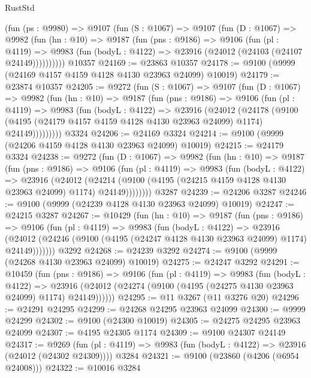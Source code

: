 \begin{lexlean}{RustStd}
\begin{coremodule}
    (fun (ps : @9980) =>
    @9107
      (fun (S : @1067) =>
      @9107
        (fun (D : @1067) =>
        @9982
          (fun (hn : @10) =>
          @9187
            (fun (pns : @9186) =>
            @9106
              (fun (pl : @4119) =>
              @9983 (fun (bodyL : @4122) => @23916 (@24012 (@24103 (@24107 @24149))))))))))
    @10357
@24169 := @23863 @10357
@24178 := @9100 (@9999 (@24169 @4157 @4159 @4128 @4130 @23963 @24099) @10019)
@24179 := @23874 @10357
@24205 := @9272
    (fun (S : @1067) =>
    @9107
      (fun (D : @1067) =>
      @9982
        (fun (hn : @10) =>
        @9187
          (fun (pns : @9186) =>
          @9106
            (fun (pl : @4119) =>
            @9983
              (fun (bodyL : @4122) =>
              @23916
                (@24012
                  (@24178
                    (@9100
                      (@4195 (@24179 @4157 @4159 @4128 @4130 @23963 @24099) @1174)
                      @24149)))))))))
    @3324
@24206 := @24169 @3324
@24214 := @9100 (@9999 (@24206 @4159 @4128 @4130 @23963 @24099) @10019)
@24215 := @24179 @3324
@24238 := @9272
    (fun (D : @1067) =>
    @9982
      (fun (hn : @10) =>
      @9187
        (fun (pns : @9186) =>
        @9106
          (fun (pl : @4119) =>
          @9983
            (fun (bodyL : @4122) =>
            @23916
              (@24012
                (@24214 (@9100 (@4195 (@24215 @4159 @4128 @4130 @23963 @24099) @1174) @24149))))))))
    @3287
@24239 := @24206 @3287
@24246 := @9100 (@9999 (@24239 @4128 @4130 @23963 @24099) @10019)
@24247 := @24215 @3287
@24267 := @10429
    (fun (hn : @10) =>
    @9187
      (fun (pns : @9186) =>
      @9106
        (fun (pl : @4119) =>
        @9983
          (fun (bodyL : @4122) =>
          @23916
            (@24012 (@24246 (@9100 (@4195 (@24247 @4128 @4130 @23963 @24099) @1174) @24149)))))))
    @3292
@24268 := @24239 @3292
@24274 := @9100 (@9999 (@24268 @4130 @23963 @24099) @10019)
@24275 := @24247 @3292
@24291 := @10459
    (fun (pns : @9186) =>
    @9106
      (fun (pl : @4119) =>
      @9983
        (fun (bodyL : @4122) =>
        @23916 (@24012 (@24274 (@9100 (@4195 (@24275 @4130 @23963 @24099) @1174) @24149))))))
@24295 := @11 @3267 (@11 @3276 @20)
@24296 := @24291 @24295
@24299 := @24268 @24295 @23963 @24099
@24300 := @9999 @24299
@24302 := @9100 (@24300 @10019)
@24305 := @24275 @24295 @23963 @24099
@24307 := @4195 @24305 @1174
@24309 := @9100 @24307 @24149
@24317 := @9269
    (fun (pl : @4119) => @9983 (fun (bodyL : @4122) => @23916 (@24012 (@24302 @24309))))
    @3284
@24321 := @9100 (@23860 (@4206 (@6954 @24008)))
@24322 := @10016 @3284

\end{coremodule}
\end{lexlean}
